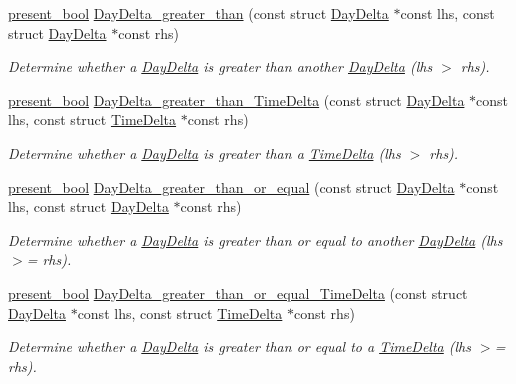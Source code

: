 \begin{DoxyCompactItemize}
\hyperlink{types_8h_a1c24e2cdd988b886e889080ded176ae0}{present\-\_\-bool} \hyperlink{day-delta_8h_a3be314820557dbfce261dce0cfec5f6d}{Day\-Delta\-\_\-greater\-\_\-than} (const struct \hyperlink{structDayDelta}{Day\-Delta} $\ast$const lhs, const struct \hyperlink{structDayDelta}{Day\-Delta} $\ast$const rhs)
\begin{DoxyCompactList}\small\item\em Determine whether a \hyperlink{structDayDelta}{Day\-Delta} is greater than another \hyperlink{structDayDelta}{Day\-Delta} (lhs $>$ rhs). \end{DoxyCompactList}\item 
\hyperlink{types_8h_a1c24e2cdd988b886e889080ded176ae0}{present\-\_\-bool} \hyperlink{day-delta_8h_a1ec0062b5246df16fbae6d28477a9814}{Day\-Delta\-\_\-greater\-\_\-than\-\_\-\-Time\-Delta} (const struct \hyperlink{structDayDelta}{Day\-Delta} $\ast$const lhs, const struct \hyperlink{structTimeDelta}{Time\-Delta} $\ast$const rhs)
\begin{DoxyCompactList}\small\item\em Determine whether a \hyperlink{structDayDelta}{Day\-Delta} is greater than a \hyperlink{structTimeDelta}{Time\-Delta} (lhs $>$ rhs). \end{DoxyCompactList}\item 
\hyperlink{types_8h_a1c24e2cdd988b886e889080ded176ae0}{present\-\_\-bool} \hyperlink{day-delta_8h_aa9e880711e48d109025c051544d630d4}{Day\-Delta\-\_\-greater\-\_\-than\-\_\-or\-\_\-equal} (const struct \hyperlink{structDayDelta}{Day\-Delta} $\ast$const lhs, const struct \hyperlink{structDayDelta}{Day\-Delta} $\ast$const rhs)
\begin{DoxyCompactList}\small\item\em Determine whether a \hyperlink{structDayDelta}{Day\-Delta} is greater than or equal to another \hyperlink{structDayDelta}{Day\-Delta} (lhs $>$= rhs). \end{DoxyCompactList}\item 
\hyperlink{types_8h_a1c24e2cdd988b886e889080ded176ae0}{present\-\_\-bool} \hyperlink{day-delta_8h_aebe4c9ab4468b8f76cce540f08e1380e}{Day\-Delta\-\_\-greater\-\_\-than\-\_\-or\-\_\-equal\-\_\-\-Time\-Delta} (const struct \hyperlink{structDayDelta}{Day\-Delta} $\ast$const lhs, const struct \hyperlink{structTimeDelta}{Time\-Delta} $\ast$const rhs)
\begin{DoxyCompactList}\small\item\em Determine whether a \hyperlink{structDayDelta}{Day\-Delta} is greater than or equal to a \hyperlink{structTimeDelta}{Time\-Delta} (lhs $>$= rhs). \end{DoxyCompactList}\end{DoxyCompactItemize}


